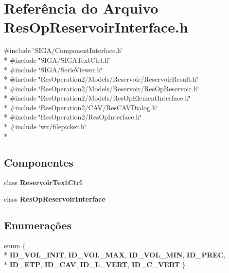 \section{Referência do Arquivo Res\+Op\+Reservoir\+Interface.\+h}
\label{_res_op_reservoir_interface_8h}
{\ttfamily \#include \char`\"{}S\+I\+G\+A/\+Component\+Interface.\+h\char`\"{}}\\*
{\ttfamily \#include \char`\"{}S\+I\+G\+A/\+S\+I\+G\+A\+Text\+Ctrl.\+h\char`\"{}}\\*
{\ttfamily \#include \char`\"{}S\+I\+G\+A/\+Serie\+Viewer.\+h\char`\"{}}\\*
{\ttfamily \#include \char`\"{}Res\+Operation2/\+Models/\+Reservoir/\+Reservoir\+Result.\+h\char`\"{}}\\*
{\ttfamily \#include \char`\"{}Res\+Operation2/\+Models/\+Reservoir/\+Res\+Op\+Reservoir.\+h\char`\"{}}\\*
{\ttfamily \#include \char`\"{}Res\+Operation2/\+Models/\+Res\+Op\+Element\+Interface.\+h\char`\"{}}\\*
{\ttfamily \#include \char`\"{}Res\+Operation2/\+C\+A\+V/\+Res\+C\+A\+V\+Dialog.\+h\char`\"{}}\\*
{\ttfamily \#include \char`\"{}Res\+Operation2/\+Res\+Op\+Interface.\+h\char`\"{}}\\*
{\ttfamily \#include \char`\"{}wx/filepicker.\+h\char`\"{}}\\*
\subsection*{Componentes}
\begin{DoxyCompactItemize}
\item 
class {\bf Reservoir\+Text\+Ctrl}
\item 
class {\bf Res\+Op\+Reservoir\+Interface}
\end{DoxyCompactItemize}
\subsection*{Enumerações}
\begin{DoxyCompactItemize}
\item 
enum \{ \\*
{\bf I\+D\+\_\+\+V\+O\+L\+\_\+\+I\+N\+IT}, 
{\bf I\+D\+\_\+\+V\+O\+L\+\_\+\+M\+AX}, 
{\bf I\+D\+\_\+\+V\+O\+L\+\_\+\+M\+IN}, 
{\bf I\+D\+\_\+\+P\+R\+EC}, 
\\*
{\bf I\+D\+\_\+\+E\+TP}, 
{\bf I\+D\+\_\+\+C\+AV}, 
{\bf I\+D\+\_\+\+L\+\_\+\+V\+E\+RT}, 
{\bf I\+D\+\_\+\+C\+\_\+\+V\+E\+RT}
 \}
\end{DoxyCompactItemize}
